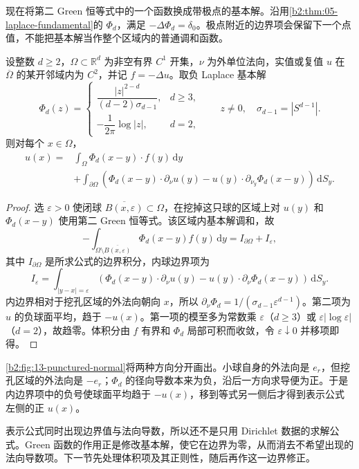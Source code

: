 现在将第二 Green 恒等式中的一个函数换成带极点的基本解。沿用\cref{b2:thm:05-laplace-fundamental}的 \(\Phi_d\)，满足 \(-\Delta\Phi_d=\delta_0\)。极点附近的边界项会保留下一个点值，不能把基本解当作整个区域内的普通调和函数。


\begin{theorem}\label{b2:thm:13-green-representation}
设整数 \(d\geq2\)，\(\Omega\subset\mathbb R^d\) 为非空有界 \(C^1\) 开集，\(\nu\) 为外单位法向，实值或复值 \(u\) 在 \(\overline\Omega\) 的某开邻域内为 \(C^2\)，并记 \(f=-\Delta u\)。取负 Laplace 基本解
\[
 \Phi_d(z)=
 \begin{cases}
 \dfrac{|z|^{2-d}}{(d-2)\sigma_{d-1}},&d\geq3,\\[3pt]
 -\dfrac1{2\pi}\log|z|,&d=2,
 \end{cases}
 \qquad z\ne0,\quad \sigma_{d-1}=|S^{d-1}|.
\]
则对每个 \(x\in\Omega\)，
\begin{equation}\label{b2:eq:13-green-representation}
 \begin{aligned}
 u(x)={}&\int_\Omega\Phi_d(x-y)\cdot f(y)\,\mathrm{d}y\\
 &+\int_{\partial\Omega}
 \left(\Phi_d(x-y)\cdot\partial_\nu u(y)
       -u(y)\cdot\partial_{\nu_y}\Phi_d(x-y)\right)\,\mathrm{d}S_y.
 \end{aligned}
\end{equation}
\end{theorem}
\begin{proof}
选 \(\varepsilon>0\) 使闭球 \(\overline{B(x,\varepsilon)}\subset\Omega\)，在挖掉这只球的区域上对 \(u(y)\) 和 \(\Phi_d(x-y)\) 使用第二 Green 恒等式。该区域内基本解调和，故
\[
 -\int_{\Omega\setminus\overline{B(x,\varepsilon)}}\Phi_d(x-y)f(y)\,\mathrm{d}y
 =I_{\partial\Omega}+I_\varepsilon,
\]
其中 \(I_{\partial\Omega}\) 是所求公式的边界积分，内球边界项为
\[
 I_\varepsilon=\int_{|y-x|=\varepsilon}
 \left(\Phi_d(x-y)\cdot\partial_\nu u(y)
 -u(y)\cdot\partial_\nu\Phi_d(x-y)\right)\,\mathrm{d}S_y.
\]
内边界相对于挖孔区域的外法向朝向 \(x\)，所以 \(\partial_\nu\Phi_d=1/(\sigma_{d-1}\varepsilon^{d-1})\)。第二项为 \(u\) 的负球面平均，趋于 \(-u(x)\)。第一项的模至多为常数乘 \(\varepsilon\)（\(d\geq3\)）或 \(\varepsilon|\log\varepsilon|\)（\(d=2\)），故趋零。体积分由 \(f\) 有界和 \(\Phi_d\) 局部可积而收敛，令 \(\varepsilon\downarrow0\) 并移项即得。
\end{proof}

\cref{b2:fig:13-punctured-normal}将两种方向分开画出。小球自身的外法向是 \(e_r\)，但挖孔区域的外法向是 \(-e_r\)；\(\Phi_d\) 的径向导数本来为负，沿后一方向求导便为正。于是内边界项中的负号使球面平均趋于 \(-u(x)\)，移到等式另一侧后才得到表示公式左侧的正 \(u(x)\)。



表示公式同时出现边界值与法向导数，所以还不是只用 Dirichlet 数据的求解公式。Green 函数的作用正是修改基本解，使它在边界为零，从而消去不希望出现的法向导数项。下一节先处理体积项及其正则性，随后再作这一边界修正。
